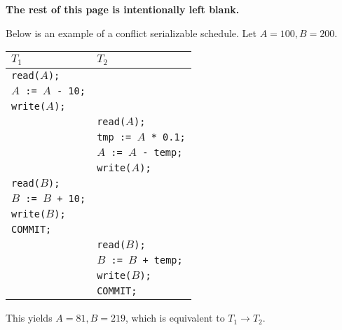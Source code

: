 \documentclass{report}
\newenvironment{example}{\begin{tcolorbox}[title={Example},colback=green!5!white,colframe=black!75!green]}{\end{tcolorbox}}
\renewcommand{\bf}[1]{\textbf{{#1}}}
\renewcommand{\tt}[1]{\texttt{{#1}}}
\begin{document}
\begin{center}
    \bf{The rest of this page is intentionally left blank.}
\end{center}
\begin{example}
    Below is an example of a conflict serializable schedule. Let
    $A = 100, B = 200$.

    {
        \centering
        \begin{tabular}{l|l}
            $T_1$ & $T_2$ \\
            \hline
            \tt{read($A$);} & \\
            \tt{$A$ := $A$ - 10;} & \\
            \tt{write($A$);} & \\
                             & \tt{read($A$);} \\
                             & \tt{tmp := $A$ * 0.1;} \\
                             & \tt{$A$ := $A$ - temp;} \\
                             & \tt{write($A$);} \\
            \tt{read($B$);} & \\
            \tt{$B$ := $B$ + 10;} & \\
            \tt{write($B$);} & \\
            \tt{COMMIT;} & \\
                         & \tt{read($B$);} \\
                         & \tt{$B$ := $B$ + temp;} \\
                         & \tt{write($B$);} \\
                         & \tt{COMMIT;} \\
        \end{tabular}
        \par
    }
    This yields $A = 81, B = 219$, which is equivalent to $T_1 \to T_2$.
\end{example}
\end{document}
